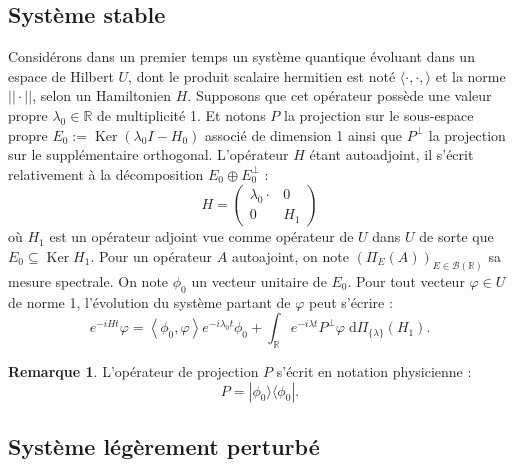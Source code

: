 \documentclass[12pt,openany,a4paper, titlepage]{article}
\newcommand{\lp}{\left(}
\newcommand{\rp}{\right)}
\newcommand{\la}{\left\langle}
\newcommand{\ra}{\right\rangle}
\newcommand{\dd}{\;\mathrm{d}}
\newcommand{\R}{\mathbb{R}}
\newcommand{\St}[2]{e^{-i #1 #2}}
\newcommand{\ortho}{P^\perp}
\newcommand{\Ker}{\operatorname{Ker}}
\theoremstyle{definition}
\theoremstyle{definition}
\theoremstyle{definition}
\theoremstyle{definition}
\theoremstyle{definition}
\newtheorem{rem}{Remarque}
\theoremstyle{definition}
\begin{document}
\subsection{Système stable}

Considérons dans un premier temps un système quantique évoluant dans un espace de Hilbert $U$, dont le produit scalaire hermitien est noté $\langle \cdot, \cdot, \rangle$ et la norme $||\cdot ||$, selon un Hamiltonien $H$. Supposons que cet opérateur possède une valeur propre $\lambda_0 \in \R$ de multiplicité 1. Et notons $P$ la projection sur le sous-espace propre $E_0 := \Ker\lp \lambda_0 I - H_0 \rp$ associé de dimension 1 ainsi que $\ortho$ la projection sur le supplémentaire orthogonal. L'opérateur $H$ étant autoadjoint, il s'écrit relativement à la décomposition $E_0\oplus E_0^\perp$ :
\begin{equation}
    H = \begin{pmatrix}
    \lambda_0 \cdot & 0 \\
    0 & H_1 
\end{pmatrix}
\end{equation}
où $H_1$ est un opérateur adjoint vue comme opérateur de $U$ dans $U$ de sorte que $E_0 \subseteq \Ker H_1$. Pour un opérateur $A$ autoajoint, on note $\lp\Pi_E(A)\rp_{E\in\mathcal{B}(\R)}$ sa mesure spectrale. On note $\phi_0$ un vecteur unitaire de $E_0$. Pour tout vecteur $\varphi \in U$ de norme 1, l'évolution du système partant de $\varphi$ peut s'écrire :
$$\St{H}{t}\varphi = \la \phi_0, \varphi \ra \St{\lambda_0}{t} \phi_0 + \int_\R \St{\lambda}{t}\ortho \varphi \dd \Pi_{\{\lambda\}}(H_1).$$

\begin{rem}
L'opérateur de projection $P$ s'écrit en notation physicienne : $$ P = |\phi_0\rangle \langle \phi_0|.$$
\end{rem}

\subsection{Système légèrement perturbé}
\end{document}
